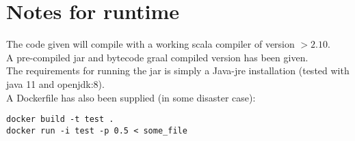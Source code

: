 \documentclass[oneside]{scrbook}
\begin{document}
\section*{Notes for runtime}
The code given will compile with a working scala compiler of version $> 2.10$.\\
A pre-compiled jar and bytecode graal compiled version has been given.\\
The requirements for running the jar is simply a Java-jre installation (tested with java 11 and openjdk:8).\\
A Dockerfile has also been supplied (in some disaster case):
\begin{lstlisting}
docker build -t test .
docker run -i test -p 0.5 < some_file
\end{lstlisting}
\end{document}
